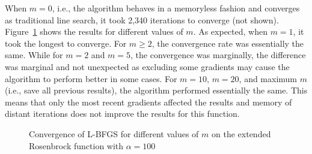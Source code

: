 When $m=0$, i.e., the algorithm behaves in a memoryless fashion and converges as traditional line search, it took 2,340 iterations to converge (not shown).  Figure~\ref{fig:p03:ResultsPlot} shows the results for different values of $m$.  As expected, when $m=1$, it took the longest to converge.  For $m\geq 2$, the convergence rate was essentially the same.  While for $m=2$ and $m=5$, the convergence was marginally, the difference was marginal and not unexpected as excluding some gradients may cause the algorithm to perform better in some cases.  For $m=10$, $m=20$, and maximum $m$ (i.e., save all previous results), the algorithm performed essentially the same.  This means that only the most recent gradients affected the results and memory of distant iterations does not improve the results for this function.

\begin{figure}
 
  \caption{Convergence of L-BFGS for different values of $m$ on the extended Rosenbrock function with $\alpha=100$}\label{fig:p03:ResultsPlot}
\end{figure}
